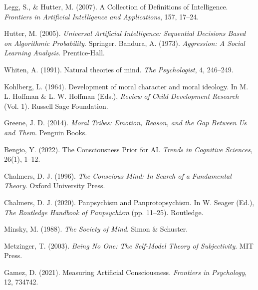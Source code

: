 \documentclass[12pt]{article}
\begin{document}
\begin{thebibliography}{999}

Legg, S., \& Hutter, M. (2007).
A Collection of Definitions of Intelligence.
\textit{Frontiers in Artificial Intelligence and Applications}, 157, 17--24.

Hutter, M. (2005).
\textit{Universal Artificial Intelligence: Sequential Decisions Based on Algorithmic Probability}.
Springer.
Bandura, A. (1973).
\textit{Aggression: A Social Learning Analysis}.
Prentice-Hall.

Whiten, A. (1991).
Natural theories of mind.
\textit{The Psychologist}, 4, 246--249.

Kohlberg, L. (1964).
Development of moral character and moral ideology.
In M. L. Hoffman \& L. W. Hoffman (Eds.),
\textit{Review of Child Development Research} (Vol. 1).
Russell Sage Foundation.

Greene, J. D. (2014).
\textit{Moral Tribes: Emotion, Reason, and the Gap Between Us and Them}.
Penguin Books.

Bengio, Y. (2022).
The Consciousness Prior for AI.
\textit{Trends in Cognitive Sciences}, 26(1), 1--12.

Chalmers, D. J. (1996).
\textit{The Conscious Mind: In Search of a Fundamental Theory}.
Oxford University Press.

Chalmers, D. J. (2020).
Panpsychism and Panprotopsychism.
In W. Seager (Ed.), \textit{The Routledge Handbook of Panpsychism}
(pp. 11--25). Routledge.

Minsky, M. (1988).
\textit{The Society of Mind}.
Simon \& Schuster.

Metzinger, T. (2003).
\textit{Being No One: The Self-Model Theory of Subjectivity}.
MIT Press.

Gamez, D. (2021).
Measuring Artificial Consciousness.
\textit{Frontiers in Psychology}, 12, 734742.



\end{thebibliography}
\end{document}
